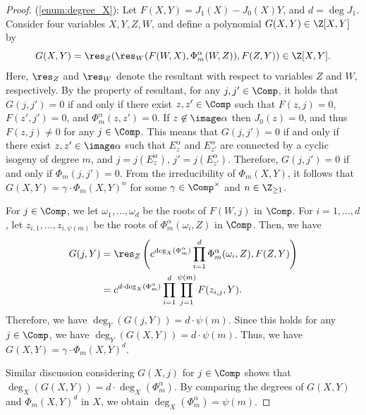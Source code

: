 \documentclass{amsart}
\theoremstyle{definition}
\theoremstyle{remark}
\numberwithin{equation}{section}
\begin{document}
\begin{proof}
    (\ref{enum:degree_X}):
    Let $F(X, Y) = J_1(X) - J_0(X) Y$,
    and $d = \deg J_1$.
    Consider four variables $X, Y, Z, W$,
    and define a polynomial $G(X, Y) \in \Z[X, Y]$ by
    \begin{equation*}
        G(X, Y) = \res_Z(\res_W(F(W, X), \Phi_m^\alpha(W, Z)), F(Z, Y)) \in \Z[X, Y].
    \end{equation*}
    Here, $\res_Z$ and $\res_W$ denote the resultant with respect to
    variables $Z$ and $W$, respectively.
    By the property of resultant,
    for any $j, j' \in \Comp$,
    it holds that $G(j, j') = 0$
    if and only if there exist $z, z' \in \Comp$
    such that $F(z, j) = 0$, $F(z', j') = 0$,
    and $\Phi_m^\alpha(z, z') = 0$.
    If $z \not\in \image \alpha$ then $J_0(z) = 0$,
    and thus $F(z, j) \neq 0$ for any $j \in \Comp$.
    This means that $G(j, j') = 0$ if and only if
    there exist $z, z' \in \image \alpha$
    such that $E_z^\alpha$ and $E_{z'}^\alpha$ are connected by
    a cyclic isogeny of degree $m$,
    and $j = j(E_z^\alpha)$, $j' = j(E_{z'}^\alpha)$.
    Therefore, $G(j, j') = 0$ if and only if $\Phi_m(j, j') = 0$.
    From the irreducibility of $\Phi_m(X, Y)$,
    it follows that $G(X, Y) = \gamma \cdot \Phi_m(X, Y)^n$ for some $\gamma \in \Comp^\times$ and $n \in \Z_{\geq 1}$.

    For $j \in \Comp$, we let $\omega_1, \dots, \omega_d$
    be the roots of $F(W, j)$ in $\Comp$.
    For $i = 1, \dots, d$,
    let $z_{i, 1}, \dots, z_{i, \psi(m)}$ be the roots of $\Phi_m^\alpha(\omega_i, Z)$ in $\Comp$.
    Then, we have
    \begin{align*}
        G(j, Y) &= \res_Z\left(c^{\deg_X(\Phi_m^\alpha)}\prod_{i=1}^{d} \Phi_m^\alpha(\omega_i, Z), F(Z, Y)\right)\\
            &= c^{d\cdot\deg_X(\Phi_m^\alpha)} \prod_{i=1}^{d} \prod_{j=1}^{\psi(m)} F(z_{i, j}, Y).
    \end{align*}
    Therefore, we have $\deg_Y(G(j, Y)) = d \cdot \psi(m)$.
    Since this holds for any $j \in \Comp$,
    we have $\deg_Y(G(X, Y)) = d \cdot \psi(m)$.
    Thus, we have $G(X, Y) = \gamma \cdot \Phi_m(X, Y)^d$.

    Similar discussion considering $G(X, j)$ for $j \in \Comp$
    shows that $\deg_X(G(X, Y)) = d\cdot\deg_X(\Phi_m^\alpha)$.
    By comparing the degrees of $G(X, Y)$ and $\Phi_m(X, Y)^d$ in $X$,
    we obtain $\deg_X(\Phi_m^\alpha) = \psi(m)$.
\end{proof}
\end{document}
